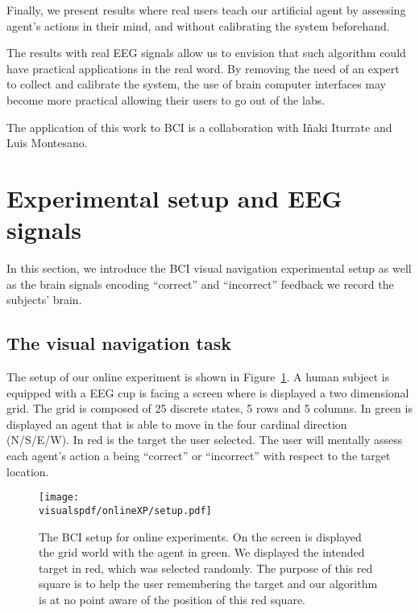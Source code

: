 Finally, we present results where real users teach our artificial agent by assessing agent's actions in their mind, and without calibrating the system beforehand.

The results with real EEG signals allow us to envision that such algorithm could have practical applications in the real word. By removing the need of an expert to collect and calibrate the system, the use of brain computer interfaces may become more practical allowing their users to go out of the labs.

The application of this work to BCI is a collaboration with I{\~n}aki Iturrate and Luis Montesano.

\section{Experimental setup and EEG signals}
\label{chapter:bci:setupandeeg}

In this section, we introduce the BCI visual navigation experimental setup as well as the brain signals encoding ``correct'' and ``incorrect'' feedback we record the subjects' brain.

\subsection{The visual navigation task}

The setup of our online experiment is shown in Figure~\ref{fig:BCIsetup}. A human subject is equipped with a EEG cup is facing a screen where is displayed a two dimensional grid. The grid is composed of 25 discrete states, 5 rows and 5 columns. In green is displayed an agent that is able to move in the four cardinal direction (N/S/E/W). In red is the target the user selected. The user will mentally assess each agent's action a being ``correct'' or ``incorrect'' with respect to the target location.

\begin{figure}[!htbp]
\centering
\texttt{[image: \\visualspdf/onlineXP/setup.pdf]}
\caption{The BCI setup for online experiments. On the screen is displayed the grid world with the agent in green. We displayed the intended target in red, which was selected randomly. The purpose of this red square is to help the user remembering the target and our algorithm is at no point aware of the position of this red square.}
\label{fig:BCIsetup}
\end{figure}

